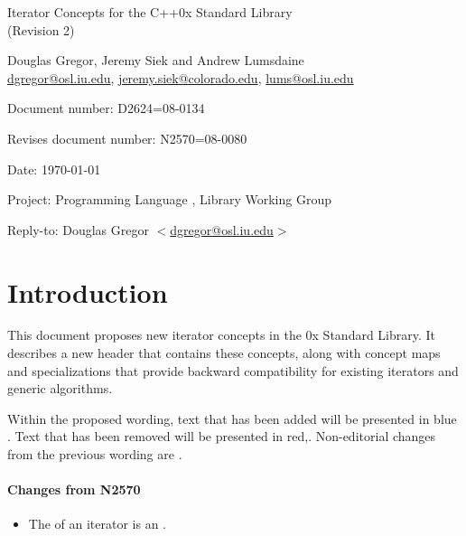 \documentclass[american,twoside]{book}
\begin{document}
\raggedbottom

\begin{titlepage}
\begin{center}
\huge
Iterator Concepts for the C++0x Standard Library\\
(Revision 2)
\vspace{0.5in}

\normalsize
Douglas Gregor, Jeremy Siek and Andrew Lumsdaine \\
\href{mailto:dgregor@osl.iu.edu}{dgregor@osl.iu.edu}, \href{mailto:jeremy.siek@colorado.edu}{jeremy.siek@colorado.edu}, \href{mailto:lums@osl.iu.edu}{lums@osl.iu.edu}
\end{center}

\vspace{1in}
\par\noindent Document number: D2624=08-0134 \vspace{-6pt}
\par\noindent Revises document number: N2570=08-0080 \vspace{-6pt}
\par\noindent Date: \today\vspace{-6pt}
\par\noindent Project: Programming Language \Cpp{}, Library Working Group\vspace{-6pt}
\par\noindent Reply-to: Douglas Gregor $<$\href{mailto:dgregor@osl.iu.edu}{dgregor@osl.iu.edu}$>$\vspace{-6pt}

\section*{Introduction}
This document proposes new iterator concepts in the \Cpp0x Standard
Library. It describes a new header  that
contains these concepts, along with concept maps and
 specializations that provide backward
compatibility for existing iterators and generic algorithms.

Within the proposed wording, text that has been added
\textcolor{addclr}{will be presented in blue} . Text that has been removed will be
presented \textcolor{remclr}{in red},. Non-editorial
changes from the previous wording are . 


\paragraph*{Changes from N2570}
\begin{itemize}
\item The  of an iterator is an .
\end{itemize}

\end{titlepage}
\end{document}
